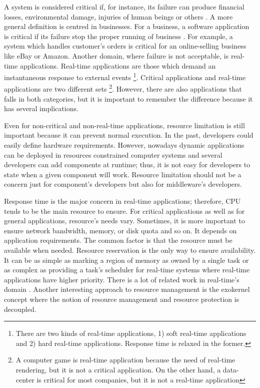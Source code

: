 A system is considered critical if, for instance, its failure can produce financial losses, environmental damage, injuries of human beings or others  \cite{Knight:2002:SCS:581339.581406}.
A more general definition is centred in businesses.
For a business, a software application is critical if its failure stop the proper running of business \cite{Knight:2002:SCS:581339.581406}.
For example, a system which handles customer's orders is critical for an online-selling business like eBay or Amazon.
Another domain, where failure is not acceptable, is real-time applications.
Real-time applications are those which demand an instantaneous response to external events \footnote{There are two kinds of real-time applications, 1) soft real-time applications and 2) hard real-time applications. Response time is relaxed in the former.}.
Critical applications and real-time applications are two different sets \footnote{A computer game is real-time application because the need of real-time rendering, but it is not a critical application. On the other hand, a data-center is critical for most companies, but it is not a real-time application}.
However, there are also applications that falls in both categories, but it is important to remember the difference because it has several implications.

Even for non-critical and non-real-time applications, resource limitation is still important because it can prevent normal execution.
In the past, developers could easily define hardware requirements.
However, nowadays dynamic applications can be deployed in resources constrained computer systems and several developers can add components at runtime; thus, it is not easy for developers to state when a given component will work.
Resource limitation should not be a concern just for component's developers but also for middleware's developers.

Response time is the major concern in real-time applications; therefore, CPU tends to be the main resource to ensure.
For critical applications  as well as for general applications, resource's needs vary.
Sometimes, it is more important to ensure network bandwidth, memory, or disk quota and so on.
It depends on application requirements.
The common factor is that the resource must be available when needed.
Resource reservation is the only way to ensure availability.
It can be as simple as marking a region of memory as owned by a single task or as complex as providing a task's scheduler for real-time systems where real-time applications have higher priority.
There is a lot of related work in real-time's domain \cite{Kirsch:2005:PMR:1064979.1064986, Zuberi:1999:ESR:319151.319170, Higuera-Toledano:2012:YRJ:2388936.2388943, Alonso:2006:FJR:1167999.1168022}.
Another interesting approach to resource management is the exokernel concept \cite{Engler:1995:EOS:224056.224076} where the notion of resource management and resource protection is decoupled.

